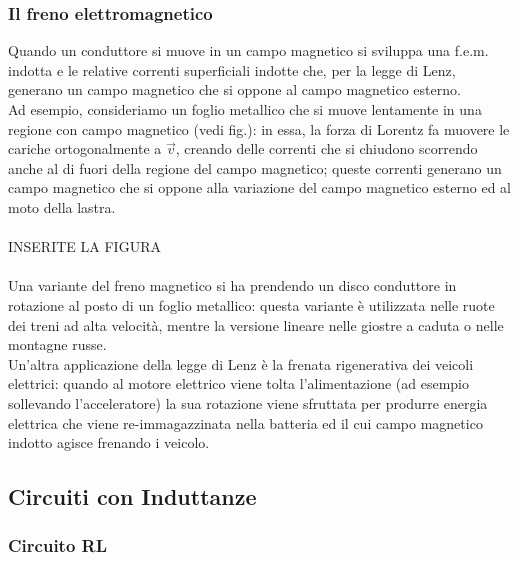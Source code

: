 \subsubsection{Il freno elettromagnetico}

Quando un conduttore si muove in un campo magnetico si sviluppa una f.e.m. indotta e le relative correnti superficiali indotte che, per la legge di Lenz, generano un campo magnetico che si oppone al campo magnetico esterno. \\ 
%
Ad esempio, consideriamo un foglio metallico che si muove lentamente in una regione con campo magnetico (vedi fig.): in essa, la forza di Lorentz fa muovere le cariche ortogonalmente a $ \vec{v} $, creando delle correnti che si chiudono scorrendo anche al di fuori della regione del campo magnetico; queste correnti generano un campo magnetico che si oppone alla variazione del campo magnetico esterno ed al moto della lastra. \\ 
%
%
%
\hbox{}\\ INSERITE LA FIGURA\\ \hbox{}\\ 
%
%
%
Una variante del freno magnetico si ha prendendo un disco conduttore in rotazione al posto di un foglio metallico: questa variante è utilizzata nelle ruote dei treni ad alta velocità, mentre la versione lineare nelle giostre a caduta o nelle montagne russe. \\ 
%
Un'altra applicazione della legge di Lenz è la frenata rigenerativa dei veicoli elettrici: quando al motore elettrico viene tolta l'alimentazione (ad esempio sollevando l'acceleratore) la sua rotazione viene sfruttata per produrre energia elettrica che viene re-immagazzinata nella batteria ed il cui campo magnetico indotto agisce frenando i veicolo.

\subsection{Circuiti con Induttanze}

\subsubsection{Circuito RL}

